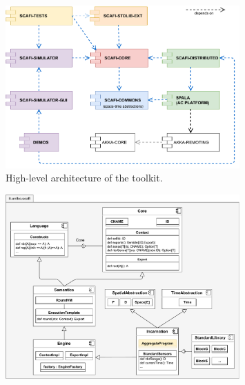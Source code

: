 \begin{figure}
\centering
\includegraphics[width=0.8\textwidth]{papers/softwarex2021/imgs/scafi-project-org.pdf}
\caption{High-level architecture of the \scafi{} toolkit.}
\label{fig:scafi-arch}
\end{figure}

\begin{figure}
\centering
\includegraphics[width=0.8\textwidth]{papers/softwarex2021/imgs/scafi-design.drawio.pdf}
\caption{}
\label{fig:scafi-design}
\end{figure}

